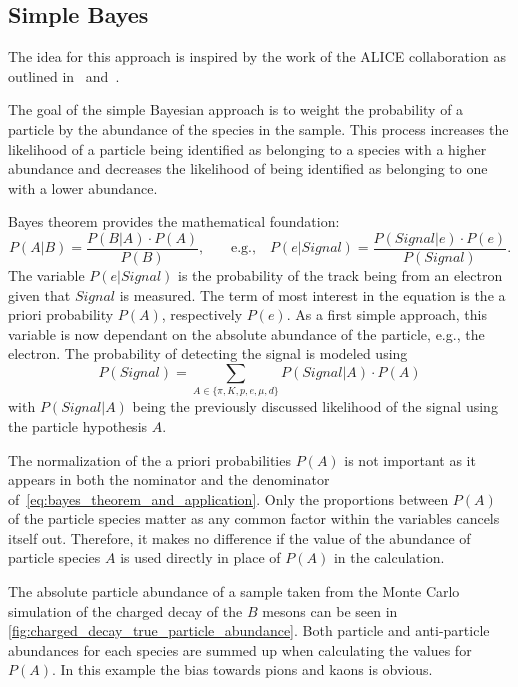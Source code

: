 \subsection{Simple Bayes}
\label{sec:bayesian_approach_simple_bayes}

The idea for this approach is inspired by the work of the ALICE collaboration as outlined in~\cite{Adam:2016acv} and~\cite{Belikov:2005zz}.

The goal of the simple Bayesian approach is to weight the probability of a particle by the abundance of the species in the sample. This process increases the likelihood of a particle being identified as belonging to a species with a higher abundance and decreases the likelihood of being identified as belonging to one with a lower abundance.

Bayes theorem provides the mathematical foundation:
\begin{equation}\label{eq:bayes_theorem_and_application}
	\displaystyle P(A|B) = \frac{P(B|A) \cdot P(A)}{P(B)}
	\text{,}
	\qquad
	\text{e.g.,} \quad P(e|Signal) = \frac{P(Signal|e) \cdot P(e)}{P(Signal)}.
\end{equation}
The variable $P(e|Signal)$ is the probability of the track being from an electron given that $Signal$ is measured. The term of most interest in the equation is the a priori probability $P(A)$, respectively $P(e)$. As a first simple approach, this variable is now dependant on the absolute abundance of the particle, e.g., the electron. The probability of detecting the signal is modeled using
\begin{equation}
	P(Signal) = \sum \limits_{A \in \{\pi, K, p, e, \mu, d\}} P(Signal|A) \cdot P(A)
\end{equation}
with $P(Signal|A)$ being the previously discussed likelihood of the signal using the particle hypothesis $A$.

The normalization of the a priori probabilities $P(A)$ is not important as it appears in both the nominator and the denominator of~\autoref{eq:bayes_theorem_and_application}. Only the proportions between $P(A)$ of the particle species matter as any common factor within the variables cancels itself out. Therefore, it makes no difference if the value of the abundance of particle species $A$ is used directly in place of $P(A)$ in the calculation.

The absolute particle abundance of a sample taken from the Monte Carlo simulation of the charged decay of the $B$ mesons can be seen in \autoref{fig:charged_decay_true_particle_abundance}. Both particle and anti-particle abundances for each species are summed up when calculating the values for $P(A)$. In this example the bias towards pions and kaons is obvious.

